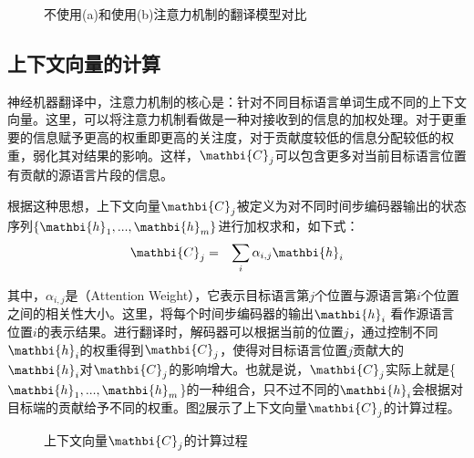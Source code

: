 \begin{figure}[htp]
\centering

\caption{不使用(a)和使用(b)注意力机制的翻译模型对比}
\label{fig:10-18}
\end{figure}

\subsection{上下文向量的计算}
\label{sec:10.1.3}

\parinterval 神经机器翻译中，注意力机制的核心是：针对不同目标语言单词生成不同的上下文向量。这里，可以将注意力机制看做是一种对接收到的信息的加权处理。对于更重要的信息赋予更高的权重即更高的关注度，对于贡献度较低的信息分配较低的权重，弱化其对结果的影响。这样，$\mathbi{C}_j$可以包含更多对当前目标语言位置有贡献的源语言片段的信息。

\parinterval 根据这种思想，上下文向量$\mathbi{C}_j$被定义为对不同时间步编码器输出的状态序列$\{ \mathbi{h}_1,...,\mathbi{h}_m \}$进行加权求和，如下式：
\begin{eqnarray}
\mathbi{C}_j&=&\sum_{i} \alpha_{i,j} \mathbi{h}_i
\label{eq:10-16}
\end{eqnarray}

\noindent 其中，$\alpha_{i,j}$是{\small{}}（Attention Weight），它表示目标语言第$j$个位置与源语言第$i$个位置之间的相关性大小。这里，将每个时间步编码器的输出$\mathbi{h}_i$ 看作源语言位置$i$的表示结果。进行翻译时，解码器可以根据当前的位置$j$，通过控制不同$\mathbi{h}_i$的权重得到$\mathbi{C}_j$，使得对目标语言位置$j$贡献大的$\mathbi{h}_i$对$\mathbi{C}_j$的影响增大。也就是说，$\mathbi{C}_j$实际上就是\{${\mathbi{h}_1,...,\mathbi{h}_m}$\}的一种组合，只不过不同的$\mathbi{h}_i$会根据对目标端的贡献给予不同的权重。图\ref{fig:10-19}展示了上下文向量$\mathbi{C}_j$的计算过程。

\begin{figure}[htp]
\centering

\caption{上下文向量$\mathbi{C}_j$的计算过程}
\label{fig:10-19}
\end{figure}

